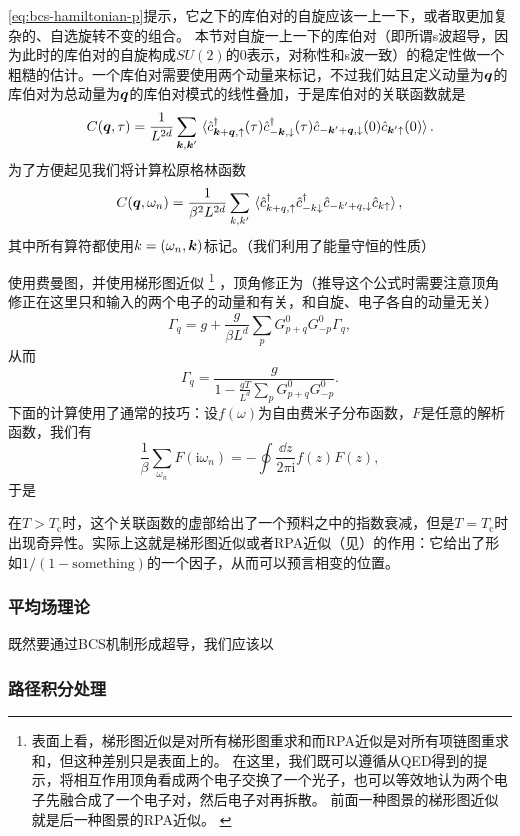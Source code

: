 \documentclass[hyperref, UTF8, a4paper]{ctexart}
\newcommand*{\ii}{\mathrm{i}}
\renewcommand{\autoref}{\prettyref}
\begin{document}
\eqref{eq:bcs-hamiltonian-p}提示，它之下的库伯对的自旋应该一上一下，或者取更加复杂的、自选旋转不变的组合。
本节对自旋一上一下的库伯对（即所谓s波超导，因为此时的库伯对的自旋构成$SU(2)$的$0$表示，对称性和s波一致）的稳定性做一个粗糙的估计。一个库伯对需要使用两个动量来标记，不过我们姑且定义动量为$\vb*{q}$的库伯对为总动量为$\vb*{q}$的库伯对模式的线性叠加，于是库伯对的关联函数就是
\begin{equation}
    C(\vb*{q}, \tau) = \frac{1}{L^{2d}} \sum_{\vb*{k}, \vb*{k}'} \expval*{\hat{c}^\dagger_{\vb*{k}+\vb*{q}, \uparrow}(\tau) \hat{c}^\dagger_{-\vb*{k}, \downarrow}(\tau) \hat{c}_{-\vb*{k}'+\vb*{q}, \downarrow}(0) \hat{c}_{\vb*{k}' \uparrow}(0)}.
\end{equation}
为了方便起见我们将计算松原格林函数
\[
    C(\vb*{q}, \omega_n) = \frac{1}{\beta^2 L^{2d}} \sum_{k, k'} \expval*{\hat{c}^\dagger_{k+q, \uparrow} \hat{c}^\dagger_{-k \downarrow} \hat{c}_{-k'+q, \downarrow} \hat{c}_{k \uparrow}},
\]
其中所有算符都使用$k=(\omega_n, \vb*{k})$标记。（我们利用了能量守恒的性质）

使用费曼图，并使用梯形图近似%
\footnote{
    表面上看，梯形图近似是对所有梯形图重求和而RPA近似是对所有项链图重求和，但这种差别只是表面上的。
    在这里，我们既可以遵循从QED得到的提示，将相互作用顶角看成两个电子交换了一个光子，也可以等效地认为两个电子先融合成了一个电子对，然后电子对再拆散。
    前面一种图景的梯形图近似就是后一种图景的RPA近似。
    \label{note:rpa-graph}
}%
，顶角修正为（推导这个公式时需要注意顶角修正在这里只和输入的两个电子的动量和有关，和自旋、电子各自的动量无关）
\[
    \Gamma_{q} = g + \frac{g}{\beta L^d} \sum_{p} G^0_{p + q} G^0_{- p} \Gamma_{q},
\]
从而
\[
    \Gamma_{q} = \frac{g}{1 - \frac{g T}{L^d} \sum_{p} G^0_{p+q} G^0_{-p}}.
\]
下面的计算使用了通常的技巧：设$f(\omega)$为自由费米子分布函数，$F$是任意的解析函数，我们有
\[
    \frac{1}{\beta} \sum_{\omega_n} F(\ii \omega_n) = - \oint \frac{\dd{z}}{2\pi \ii} f(z) F(z),
\]
于是

在$T>T_\text{c}$时，这个关联函数的虚部给出了一个预料之中的指数衰减，但是$T = T_\text{c}$时出现奇异性。实际上这就是梯形图近似或者RPA近似（见\autoref{note:rpa-graph}）的作用：它给出了形如$1/(1-\text{something})$的一个因子，从而可以预言相变的位置。

\subsubsection{平均场理论}

既然要通过BCS机制形成超导，我们应该以

\subsubsection{路径积分处理}
\end{document}
